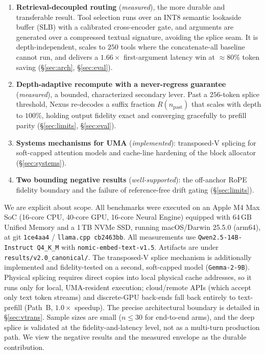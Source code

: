 \documentclass[10pt,conference]{IEEEtran}
\newcommand{\code}[1]{\texttt{\small #1}}
\begin{document}
\begin{enumerate}
  \item \textbf{Retrieval-decoupled routing} (\emph{measured}), the more durable and transferable
  result. Tool selection runs over an INT8 semantic lookaside buffer (SLB) with a calibrated
  cross-encoder gate, and arguments are generated over a compressed textual signature, avoiding the
  splice seam. It is depth-independent, scales to $250$ tools where the concatenate-all baseline
  cannot run, and delivers a $1.66\times$ first-argument latency win at ${\approx}80\%$ token saving
  (\S\ref{sec:arch}, \S\ref{sec:eval}).
  \item \textbf{Depth-adaptive recompute with a never-regress guarantee} (\emph{measured}), a
  bounded, characterized secondary lever. Past a $256$-token splice threshold, Nexus re-decodes a
  suffix fraction $R(n_{\mathrm{past}})$ that scales with depth to $100\%$, holding output fidelity
  exact and converging gracefully to prefill parity (\S\ref{sec:limits}, \S\ref{sec:eval}).
  \item \textbf{Systems mechanisms for UMA} (\emph{implemented}): transposed-V splicing for
  soft-capped attention models and cache-line hardening of the block allocator
  (\S\ref{sec:systems}).
  \item \textbf{Two bounding negative results} (\emph{well-supported}): the off-anchor
  RoPE fidelity boundary and the failure of reference-free drift gating (\S\ref{sec:limits}).
\end{enumerate}

We are explicit about scope. All benchmarks were executed on an Apple M4 Max SoC (16-core CPU, 40-core GPU, 16-core Neural Engine) equipped with 64\,GB Unified Memory and a 1\,TB NVMe SSD, running macOS/Darwin 25.5.0 (arm64), at git \code{1ce4aa4} / \code{llama.cpp cb2463bb}. All measurements use \code{Qwen2.5-14B-Instruct Q4\_K\_M} with \code{nomic-embed-text-v1.5}. Artifacts are under \code{results/v2.0\_canonical/}. The transposed-V splice mechanism is additionally implemented and fidelity-tested on a second, soft-capped model (\code{Gemma-2-9B}). Physical splicing requires direct copies into local physical cache addresses, so it runs only for local, UMA-resident execution; cloud/remote APIs (which accept only text token streams) and discrete-GPU back-ends fall back entirely to text-prefill (Path~B, $1.0\times$ speedup). The precise architectural boundary is detailed in \S\ref{sec:vtrans}. Sample sizes are small ($n\!\le\!30$ for end-to-end arms), and the deep splice is validated at the fidelity-and-latency level, not as a multi-turn production path. We view the negative results and the measured envelope as the durable contribution.
\end{document}

